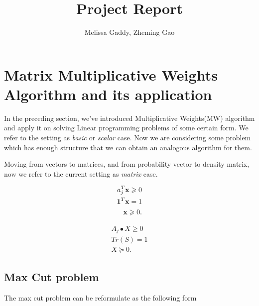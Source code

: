 \documentclass[12pt]{article}
\begin{document}
 
 
\title{Project Report}
\author{Melissa Gaddy, Zheming Gao}
\maketitle

\section{Matrix Multiplicative Weights Algorithm and its application}

In the preceding section, we've introduced Multiplicative Weights(MW) algorithm and apply it on solving Linear programming problems of some certain form. We refer to the setting as \textit{basic} or  \textit{scalar} case. Now we are considering some problem which has enough structure that we can obtain an analogous algorithm for them.

Moving from vectors to matrices, and from probability vector to density matrix, now we refer to the current setting as \textit{matrix} case. 

\begin{minipage}{0.5\linewidth}


\begin{align*}
a_j^T \textbf x \geqslant 0 \\
\mathbf 1^T\textbf x = 1 \\
\textbf x\geqslant 0.
\end{align*}

\end{minipage}
\begin{minipage}{0.5\linewidth}

\begin{align*}
A_j \bullet X \geqslant 0 \\
Tr(S) = 1 \\
X \succeq 0.
\end{align*}

\end{minipage}

\subsection{Max Cut problem}

The max cut problem can be reformulate as the following form
\end{document}
